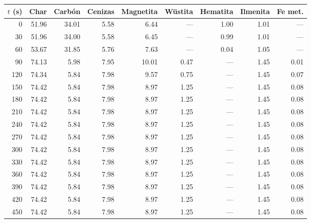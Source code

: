 \begin{table}[htbp]
\centering\footnotesize
\begin{tabular}{rrrrrrrrr}
\toprule
$t$ (\si{\second}) & Char & Carbón & Cenizas & Magnetita & Wüstita & Hematita & Ilmenita & Fe met. \\
\midrule
0 & \num{51.96} & \num{34.01} & \num{5.58} & \num{6.44} & --- & \num{1.00} & \num{1.01} & --- \\
30 & \num{51.96} & \num{34.00} & \num{5.58} & \num{6.45} & --- & \num{0.99} & \num{1.01} & --- \\
60 & \num{53.67} & \num{31.85} & \num{5.76} & \num{7.63} & --- & \num{0.04} & \num{1.05} & --- \\
90 & \num{74.13} & \num{5.98} & \num{7.95} & \num{10.01} & \num{0.47} & --- & \num{1.45} & \num{0.01} \\
120 & \num{74.34} & \num{5.84} & \num{7.98} & \num{9.57} & \num{0.75} & --- & \num{1.45} & \num{0.07} \\
150 & \num{74.42} & \num{5.84} & \num{7.98} & \num{8.97} & \num{1.25} & --- & \num{1.45} & \num{0.08} \\
180 & \num{74.42} & \num{5.84} & \num{7.98} & \num{8.97} & \num{1.25} & --- & \num{1.45} & \num{0.08} \\
210 & \num{74.42} & \num{5.84} & \num{7.98} & \num{8.97} & \num{1.25} & --- & \num{1.45} & \num{0.08} \\
240 & \num{74.42} & \num{5.84} & \num{7.98} & \num{8.97} & \num{1.25} & --- & \num{1.45} & \num{0.08} \\
270 & \num{74.42} & \num{5.84} & \num{7.98} & \num{8.97} & \num{1.25} & --- & \num{1.45} & \num{0.08} \\
300 & \num{74.42} & \num{5.84} & \num{7.98} & \num{8.97} & \num{1.25} & --- & \num{1.45} & \num{0.08} \\
330 & \num{74.42} & \num{5.84} & \num{7.98} & \num{8.97} & \num{1.25} & --- & \num{1.45} & \num{0.08} \\
360 & \num{74.42} & \num{5.84} & \num{7.98} & \num{8.97} & \num{1.25} & --- & \num{1.45} & \num{0.08} \\
390 & \num{74.42} & \num{5.84} & \num{7.98} & \num{8.97} & \num{1.25} & --- & \num{1.45} & \num{0.08} \\
420 & \num{74.42} & \num{5.84} & \num{7.98} & \num{8.97} & \num{1.25} & --- & \num{1.45} & \num{0.08} \\
450 & \num{74.42} & \num{5.84} & \num{7.98} & \num{8.97} & \num{1.25} & --- & \num{1.45} & \num{0.08} \\

\end{tabular}
\end{table}
